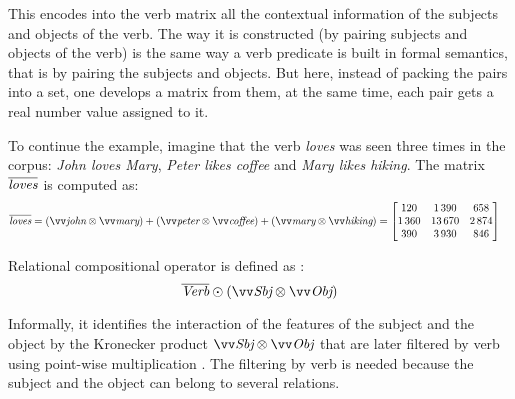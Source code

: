 This encodes into the verb matrix all the contextual information of the subjects and objects of the verb. The way it is constructed (by pairing subjects and objects of the verb) is the same way a verb predicate is built in formal semantics, that is by pairing the subjects and objects. But here, instead of packing the pairs into a set, one develops a matrix from them, at the same time, each pair gets a real number value assigned to it.

To continue the example, imagine that the verb \textit{loves} was seen three times in the corpus: \textit{John loves Mary}, \textit{Peter likes coffee} and \textit{Mary likes hiking}. The matrix $\overline{\text{\it loves}}$ is computed as:
\begin{align*}
  \overline{\text{\it loves}} &= (\ov{\text{\it john}} \otimes \ov{\text{\it mary}}) + %
                                 (\ov{\text{\it peter}} \otimes \ov{\text{\it coffee}}) + %
                                 (\ov{\text{\it mary}} \otimes \ov{\text{\it hiking}}) = %
                                \begin{bmatrix}
                                     120 &  1\,390 &    658 \\
                                  1\,360 & 13\,670 & 2\,874 \\
                                     390 &  3\,930 &    846
                                \end{bmatrix}
\end{align*}

Relational compositional operator is defined as \cite{Grefenstette:2011:ESC:2145432.2145580}:
\begin{equation*}
  \overline{\text{\it Verb}} \odot (\ov{\text{\it Sbj}} \otimes \ov{\text{\it Obj}})
\end{equation*}

Informally, it identifies the interaction of the features of the subject and the object by the Kronecker product $\ov{\text{\it Sbj}} \otimes \ov{\text{\it Obj}}$ that are later filtered by verb using point-wise multiplication \cite{Grefenstette:2011:ESC:2145432.2145580}. The filtering by verb is needed because the subject and the object can belong to several relations.

